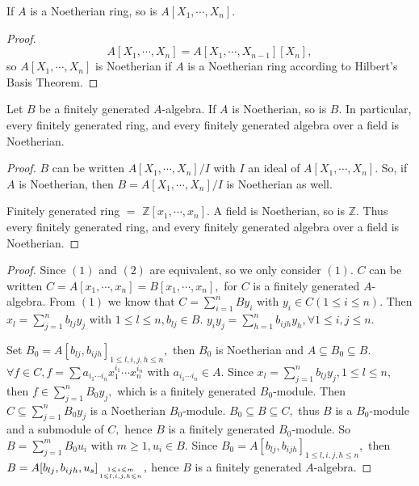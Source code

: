 \begin{cor}
If $A$ is a Noetherian ring, so is $A[X_1,\cdots,X_n].$
\end{cor}
\begin{proof}
$$A[X_1,\cdots,X_n]=A[X_1,\cdots,X_{n-1}][X_n],$$
so $A[X_1,\cdots,X_n]$ is Noetherian if $A$ is a Noetherian ring
according to Hilbert's Basis Theorem.
\end{proof}
\begin{cor}
Let $B$ be a finitely generated $A$-algebra. If $A$ is Noetherian,
so is $B.$ In particular, every finitely generated ring, and every
finitely generated algebra over a field is Noetherian.
\end{cor}
\begin{proof}
$B$ can be written $A[X_1,\cdots,X_n]/I$ with $I$ an ideal of
$A[X_1,\cdots,X_n].$ So, if $A$ is Noetherian, then
$B=A[X_1,\cdots,X_n]/I$ is Noetherian as well.

Finitely generated ring $=$ $\mathbb{Z}[x_1,\cdots,x_n].$ A field is
Noetherian, so is $\mathbb{Z}.$ Thus every finitely generated ring,
and every finitely generated algebra over a field is Noetherian.
\end{proof}
\begin{proof}
Since $(1)$ and $(2)$ are equivalent, so we only consider $(1).$ $C$
can be written $C=A[x_1,\cdots,x_n]=B[x_1,\cdots,x_n],$ for $C$ is a
finitely generated $A$-algebra. From $(1)$ we know that
$C=\sum\limits_{i=1}^n By_i$ with $y_i\in C(1\leqslant i\leqslant
n).$ Then $x_l=\sum\limits_{j=1}^n b_{lj}y_j$ with $1\leqslant
l\leqslant n, b_{lj}\in B.$ $y_iy_j=\sum\limits_{h=1}^n b_{ijh}y_h,
\forall 1\leqslant i,j\leqslant n.$

Set $B_0=A[b_{lj},b_{ijh}]_{1\leqslant l,i,j,h\leqslant n},$ then
$B_0$ is Noetherian and $A\subseteq B_0\subseteq B.$ $\forall f\in
C, f=\sum a_{i_1\cdots i_n}x_1^{i_1}\cdots x_n^{i_n}$ with
$a_{i_1\cdots i_n}\in A.$ Since $x_l=\sum\limits_{j=1}^n b_{lj}y_j,
1\leqslant l\leqslant n,$ then $f\in \sum\limits_{j=1}^nB_0y_j,$
which is a finitely generated $B_0$-module. Then $C\subseteq
\sum\limits_{j=1}^n B_0y_j$ is a Noetherian $B_0$-module.
$B_0\subseteq B\subseteq C,$ thus $B$ is a $B_0$-module and a
submodule of $C,$ hence $B$ is a finitely generated $B_0$-module. So
$B=\sum\limits_{j=1}^m B_0u_i$ with $m\geqslant 1, u_i\in B.$ Since
$B_0=A[b_{lj},b_{ijh}]_{1\leqslant l,i,j,h\leqslant n},$ then
$B=A[b_{lj},b_{ijh},u_s]_{1\leqslant s\leqslant m \atop 1\leqslant
l,i,j,h\leqslant n },$ hence $B$ is a finitely generated
$A$-algebra.
\end{proof}
